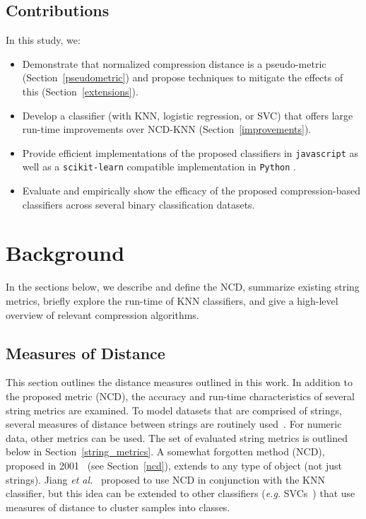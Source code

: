 \documentclass[preprint,12pt]{elsarticle}
\begin{document}
\subsection{Contributions}
In this study, we:

\begin{itemize}
    \item Demonstrate that normalized compression distance is a pseudo-metric (Section~\ref{pseudometric}) and propose techniques to mitigate the effects of this (Section~\ref{extensions}).
    \item Develop a classifier (with KNN, logistic regression, or SVC) that offers large run-time improvements over NCD-KNN (Section~\ref{improvements}).
    \item Provide efficient implementations of the proposed classifiers in \texttt{javascript} as well as a \texttt{scikit-learn} compatible implementation in \texttt{Python} .
    \item Evaluate and empirically show the efficacy of the proposed compression-based classifiers across several binary classification datasets.
\end{itemize}





\section{Background}

In the sections below, we describe and define the NCD, summarize existing string metrics, briefly explore the run-time of KNN classifiers, and give a high-level overview of relevant compression algorithms.



\subsection{Measures of Distance}

This section outlines the distance measures outlined in this work.
In addition to the proposed metric (NCD), the accuracy and run-time characteristics of several string metrics are examined.
To model datasets that are comprised of strings, several measures of distance between strings are routinely used~\cite{levenshtein}.
For numeric data, other metrics can be used.
The set of evaluated string metrics is outlined below in Section~\ref{string_metrics}.
A somewhat forgotten method (NCD), proposed in 2001~\cite{ncd} (see Section~\ref{ncd}), extends to any type of object (not just strings).
Jiang \textit{et al.}~\cite{jiang2022less} proposed to use NCD in conjunction with the KNN classifier, but this idea can be extended to other classifiers (\textit{e.g.} SVCs~\cite{vapnik1994measuring}) that use measures of distance to cluster samples into classes.
\end{document}
